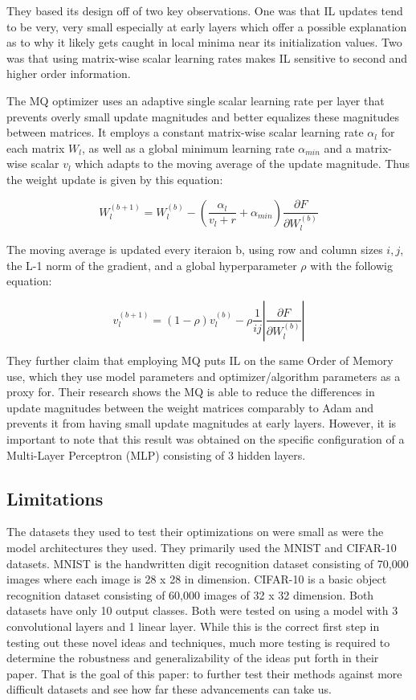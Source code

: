 \documentclass{article}
\theoremstyle{plain}
\theoremstyle{definition}
\theoremstyle{remark}
\begin{document}
They based its design off of two key observations. One was that IL updates tend to 
be very, very small especially at early layers which offer a possible explanation as
to why it likely gets caught in local minima near its initialization values. Two was that
using matrix-wise scalar learning rates makes IL sensitive to second and higher order 
information. 

The MQ optimizer uses an adaptive single scalar learning rate per layer that prevents 
overly small update magnitudes and better equalizes these magnitudes between 
matrices. It employs a constant matrix-wise scalar learning rate \(\alpha_l\) for 
each matrix \(W_l\), as well as a global minimum learning rate \(\alpha_{min}\) and a 
matrix-wise scalar \(v_l\) which adapts to the moving average of the update magnitude.
Thus the weight update is given by this equation:

\begin{equation}
W_{l}^{(b+1)} = W_{l}^{(b)} - (\frac{\alpha_{l}}{v_{l} + r} + \alpha_{min}) \frac{\partial F}{\partial W_{l}^{(b)}}
\end{equation}

The moving average is updated every iteraion b, using row and column sizes \(i, j\), the L-1 norm 
of the gradient, and a global hyperparameter \(\rho\) with the followig equation:

\begin{equation}
v_{l}^{(b+1)} = (1 - \rho)v_{l}^{(b)} - \rho \frac{1}{ij} \left| \frac{\partial F}{\partial W_{l}^{(b)}} \right|
\end{equation}

They further claim that employing MQ puts IL on the same Order of Memory use, which they use model parameters and 
optimizer/algorithm parameters as a proxy for. Their research shows the MQ is able to reduce the differences in update magnitudes 
between the weight matrices comparably to Adam and prevents it from having small update magnitudes
at early layers. However, it is important to note that this result was obtained on the 
specific configuration of a Multi-Layer Perceptron (MLP) consisting of 3 hidden layers.


\subsection*{Limitations}

The datasets they used to test their optimizations on were small as were the model 
architectures they used. They primarily used the MNIST and CIFAR-10 datasets. MNIST is the 
handwritten digit recognition dataset consisting of 70,000 images where each image is 28 x 28 
in dimension. CIFAR-10 is a basic object recognition dataset consisting of 60,000 images of 
32 x 32 dimension. Both datasets have only 10 output classes. Both were tested on using 
a model with 3 convolutional layers and 1 linear layer. While this is the correct first step 
in testing out these novel ideas and techniques, much more testing is required to determine 
the robustness and generalizability of the ideas put forth in their paper. That is the goal 
of this paper: to further test their methods against more difficult datasets and see how far 
these advancements can take us.
\end{document}
